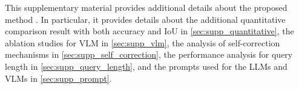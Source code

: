 \clearpage
\setcounter{page}{1}
\maketitlesupplementary

\noindent This supplementary material provides additional details about the proposed method \methodname{}. In particular, it provides details about 
the additional quantitative comparison result with both accuracy and IoU in \autoref{sec:supp_quantitative},
the ablation studies for VLM in \autoref{sec:supp_vlm}, 
the analysis of self-correction mechanisms in \autoref{sec:supp_self_correction}, 
the performance analysis for query length in \autoref{sec:supp_query_length},
and the prompts used for the LLMs and VLMs in \autoref{sec:supp_prompt}.




